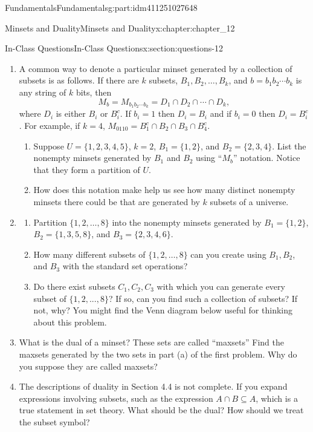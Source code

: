 \documentclass[oneside,10pt,]{book}
\numberwithin{equation}{section}
\begin{document}
\begin{partptx}{Fundamentals}{}{Fundamentals}{}{}{g:part:idm411251027648}
\begin{chapterptx}{Minsets and Duality}{}{Minsets and Duality}{}{}{x:chapter:chapter_12}
\begin{sectionptx}{In-Class Questions}{}{In-Class Questions}{}{}{x:section:questions-12}
\begin{enumerate}[label=\arabic*.]
\item{}A common way to denote a particular minset generated by a collection of subsets is as follows.  If there are \(k\) subsets, \(B_1, B_2, \dots ,B_k\), and \(b=b_1b_2\cdots b_k\) is any string of \(k\) bits, then%
\begin{equation*}
M_b =  M_{b_1b_2\cdots b_k} = D_1 \cap D_2 \cap \cdots \cap D_k,
\end{equation*}
where \(D_i\) is either \(B_i\) or \(B_i^c\).  If \(b_i = 1\) then \(D_i =B_i\) and if \(b_i=0\) then \(D_i=B_i^c\).  For example, if \(k=4\), \(M_{0110} = B_1^c \cap B_2 \cap B_3 \cap B_4^c\).%
\begin{enumerate}[label=(\alph*)]
\item{}Suppose \(U=\{1, 2, 3, 4, 5\}\), \(k=2\), \(B_1= \{1, 2\}\), and \(B_2 = \{2,3,4\}\).  List the nonempty minsets generated by \(B_1\) and \(B_2\) using ``\(M_b\)'' notation. Notice that they form a partition of \(U\).%
\item{}How does this notation make help us see how many distinct nonempty minsets there could be that are generated by \(k\) subsets of a universe.%
\end{enumerate}
%
\item{}%
\begin{enumerate}[label=(\alph*)]
\item{}Partition \(\{1, 2,  \dots, 8\}\) into the nonempty minsets generated by \(B_1= \{1, 2\}\), \(B_2 = \{1, 3, 5, 8\}\), and \(B_3 = \{2, 3, 4, 6\}\).%
\item{}How many different subsets of \(\{1, 2, \dots ,8\}\) can you create using \(B_1, B_2\), and \(B_3\) with the standard set operations?%
\item{}Do there exist subsets \(C_1, C_2, C_3\) with which you can generate every subset of \(\{1,2, . . . ,8\}\)?  If so, can you find such a collection of subsets?  If not, why?  You might find the Venn diagram below useful for thinking about this problem.%
\end{enumerate}
%
\item{}What is the dual of a minset?  These sets are called ``maxsets''  Find the maxsets generated by the two sets in part (a) of the first problem.   Why do you suppose they are called maxsets?%
\item{}The descriptions of duality in Section 4.4 is not complete.  If you expand expressions involving subsets, such as the expression \(A \cap B \subseteq A\), which is a true statement in set theory.  What should be the dual?  How should we treat the subset symbol?%

\end{enumerate}
\end{sectionptx}
\end{chapterptx}
\end{partptx}
\end{document}
